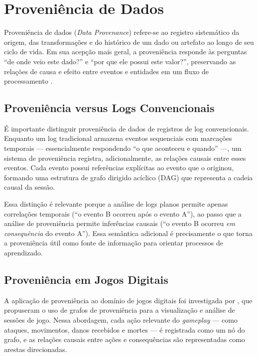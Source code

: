 \section{Proveniência de Dados}
\label{sec:proveniencia}

Proveniência de dados (\textit{Data Provenance}) refere-se ao registro
sistemático da origem, das transformações e do histórico de um dado ou
artefato ao longo de seu ciclo de vida. Em sua acepção mais geral, a
proveniência responde às perguntas ``de onde veio este dado?'' e ``por que ele
possui este valor?'', preservando as relações de causa e efeito entre eventos
e entidades em um fluxo de processamento \cite{provenance_base}.

\subsection{Proveniência versus Logs Convencionais}
\label{subsec:proveniencia-vs-logs}

É importante distinguir proveniência de dados de registros de log
convencionais. Enquanto um log tradicional armazena eventos sequenciais com
marcações temporais --- essencialmente respondendo ``o que aconteceu e
quando'' ---, um sistema de proveniência registra, adicionalmente, as relações
causais entre esses eventos. Cada evento possui referências explícitas ao
evento que o originou, formando uma estrutura de grafo dirigido acíclico (DAG)
que representa a cadeia causal da sessão.

Essa distinção é relevante porque a análise de logs planos permite apenas
correlações temporais (``o evento B ocorreu após o evento A''), ao passo que
a análise de proveniência permite inferências causais (``o evento B ocorreu
\textit{em consequência} do evento A''). Essa semântica adicional é
precisamente o que torna a proveniência útil como fonte de informação para
orientar processos de aprendizado.

\subsection{Proveniência em Jogos Digitais}
\label{subsec:proveniencia-jogos}

A aplicação de proveniência ao domínio de jogos digitais foi investigada por
, que propuseram o uso de grafos de proveniência
para a visualização e análise de sessões de jogo. Nessa abordagem, cada ação
relevante do \textit{gameplay} --- como ataques, movimentos, danos recebidos e
mortes --- é registrada como um nó do grafo, e as relações causais entre ações
e consequências são representadas como arestas direcionadas.

